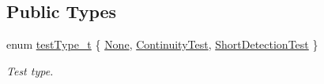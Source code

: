 \subsection*{Public Types}
\begin{DoxyCompactItemize}
\item 
enum \hyperlink{classmdt_tt_test_model_generation_dialog_a833486450bf0b6414015ab3b8e8432da}{test\-Type\-\_\-t} \{ \hyperlink{classmdt_tt_test_model_generation_dialog_a833486450bf0b6414015ab3b8e8432daa3807ce57486f6f97b5b3e3a5ac6c8f6b}{None}, 
\hyperlink{classmdt_tt_test_model_generation_dialog_a833486450bf0b6414015ab3b8e8432daa874b49b7c1b3db4880ffb3bbd93dbe67}{Continuity\-Test}, 
\hyperlink{classmdt_tt_test_model_generation_dialog_a833486450bf0b6414015ab3b8e8432daac24ac1aeaa9493c89f7f934d05d02a3e}{Short\-Detection\-Test}
 \}
\begin{DoxyCompactList}\small\item\em Test type. \end{DoxyCompactList}\end{DoxyCompactItemize}
